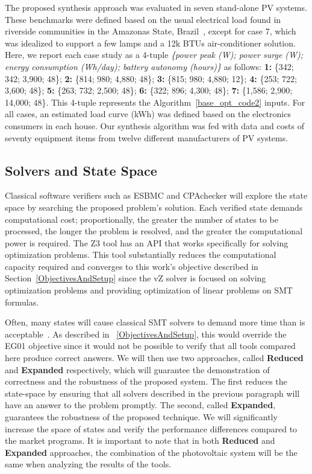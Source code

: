 \documentclass[journal]{IEEEtran}
\begin{document}
The proposed synthesis approach was evaluated in seven stand-alone PV systems. These benchmarks were defined based on the usual electrical load found in riverside communities in the Amazonas State, Brazil~\cite{TrindadeCordeiro19,Agrener2013}, except for case 7, which was idealized to support a few lamps and a 12k BTUs air-conditioner solution. 
Here, we report each case study as a 4-tuple \textit{\{power peak (W); power surge (W); energy consumption (Wh/day); battery autonomy (hours)\}} as follows:
  \textbf{1:} \{342; 342; 3,900; 48\}; \textbf{2:} \{814; 980; 4,880; 48\}; \textbf{3:} \{815; 980; 4,880; 12\}; \textbf{4:} \{253; 722; 3,600; 48\}; \textbf{5:} \{263; 732; 2,500; 48\}; \textbf{6:} \{322; 896; 4,300; 48\}; \textbf{7:} \{1,586; 2,900; 14,000; 48\}. This 4-tuple represents the Algorithm~\ref{base_opt_code2} inputs. For all cases, an estimated load curve (kWh) was defined based on the electronics consumers in each house. Our synthesis algorithm was fed with data and costs of seventy equipment items from twelve different manufacturers of PV systems. 
%

\subsection{Solvers and State Space}
\label{sec:SolversandStateSpace}
  Classical software verifiers such as ESBMC and CPAchecker will explore the state space by searching the proposed problem's solution. Each verified state demands computational cost; proportionally, the greater the number of states to be processed, the longer the problem is resolved, and the greater the computational power is required. The Z3 tool has an API that works specifically for solving optimization problems. This tool substantially reduces the computational capacity required and converges to this work's objective described in Section~\ref{ObjectivesAndSetup} since the vZ solver is focused on solving optimization problems and providing optimization of linear problems on SMT formulas.

Often, many states will cause classical SMT solvers to demand more time than is acceptable~\cite{abs-1909-13139}. As described in ~\ref{ObjectivesAndSetup}, this would override the EG01 objective since it would not be possible to verify that all tools compared here produce correct answers. We will then use two approaches, called \textbf{Reduced} and \textbf{Expanded} respectively, which will guarantee the demonstration of correctness and the robustness of the proposed system. The first reduces the state-space by ensuring that all solvers described in the previous paragraph will have an answer to the problem promptly. The second, called \textbf{Expanded}, guarantees the robustness of the proposed technique. We will significantly increase the space of states and verify the performance differences compared to the market programs. It is important to note that in both \textbf{Reduced} and \textbf{Expanded} approaches, the combination of the photovoltaic system will be the same when analyzing the results of the tools.
\end{document}
